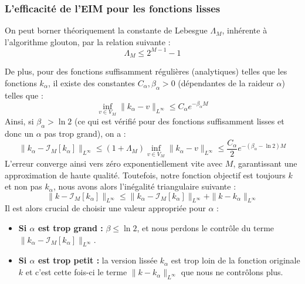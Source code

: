 \documentclass[12pt,a4paper]{article}
\begin{document}
\subsubsection{L'efficacité de l'EIM pour les fonctions lisses \label{sec:efficacite_eim}}

On peut borner théoriquement la constante de Lebesgue $\Lambda_M$, inhérente à l'algorithme glouton, par la relation suivante \cite{barrault2004} :
\begin{equation*}
    \Lambda_M \leq 2^{M-1} - 1
\end{equation*}

De plus, pour des fonctions suffisamment régulières (analytiques) telles que les fonctions $k_{\alpha}$, il existe des constantes $C_{\alpha}, \beta_{\alpha} > 0$ (dépendantes de la raideur $\alpha$) telles que \cite{trefethen2013} :
\begin{equation*}
    \inf_{v \in V_M} \| k_{\alpha} - v \|_{L^\infty} \leq C_{\alpha} e^{-\beta_{\alpha} M}
\end{equation*}
Ainsi, si $\beta_{\alpha} > \ln 2$ (ce qui est vérifié pour des fonctions suffisamment lisses et donc un $\alpha$ pas trop grand), on a :
\begin{equation*}
    \| k_{\alpha} - \mathcal{I}_M[k_{\alpha}] \|_{L^\infty} \leq (1 + \Lambda_M) \inf_{v \in V_M} \| k_{\alpha} - v \|_{L^\infty} \leq \frac{C_{\alpha}}{2} e^{-(\beta_{\alpha} - \ln 2) M}
\end{equation*}
L'erreur converge ainsi vers zéro exponentiellement vite avec $M$, garantissant une approximation de haute qualité. Toutefois, notre fonction objectif est toujours $k$ et non pas $k_{\alpha}$, nous avons alors l'inégalité triangulaire suivante :
\begin{equation*}
    \| k - \mathcal{I}_M[k_{\alpha}] \|_{L^\infty} \leq \| k_{\alpha} - \mathcal{I}_M[k_{\alpha}] \|_{L^\infty} + \| k - k_{\alpha} \|_{L^\infty} 
\end{equation*}
Il est alors crucial de choisir une valeur appropriée pour $\alpha$ :
\begin{itemize}
    \item \textbf{Si $\alpha$ est trop grand  :} $\beta \leq \ln 2$, et nous perdons le contrôle du terme $\| k_{\alpha} - \mathcal{I}_M[k_{\alpha}] \|_{L^\infty}$.
    \item \textbf{Si $\alpha$ est trop petit :} la version lissée $k_{\alpha}$ est trop loin de la fonction originale $k$ et c'est cette fois-ci le terme $\| k - k_{\alpha} \|_{L^\infty}$ que nous ne contrôlons plus.
\end{itemize}
\end{document}
